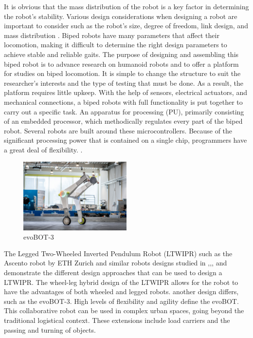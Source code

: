 It is obvious that the mass distribution of the robot is a key factor in determining the robot's stability.
Various design considerations when designing a robot are important to consider such as the robot's size, degree of freedom, link design, and mass distribution \cite{nath2017design}.
Biped robots have many parameters that affect their locomotion, making it difficult to determine the right design parameters to achieve stable and reliable gaits.
The purpose of designing and assembling this biped robot is to advance research on humanoid robots and to offer a platform for studies on biped locomotion.
It is simple to change the structure to suit the researcher's interests and the type of testing that must be done.
As a result, the platform requires little upkeep.
With the help of sensors, electrical actuators, and mechanical connections, a biped robots with full functionality is put together to carry out a specific task.
An apparatus for processing (PU), primarily consisting of an embedded processor, which methodically regulates every part of the biped robot.
Several robots are built around these microcontrollers.
Because of the significant processing power that is contained on a single chip, programmers have a great deal of flexibility.
 \cite{madadi2007design}.
\begin {figure}[h]
\centering
\includegraphics[width=0.5\textwidth]{evoBOT-3}
\caption{evoBOT-3\cite{klokowski2023evobot}}
\label{fig:evoBOT-3}
\end {figure}

The Legged Two-Wheeled Inverted Pendulum Robot (LTWIPR) such as the Ascento robot by ETH Zurich \cite{klemm2019ascento} and similar robots designs studied in \cite{guo2022design},\cite{zhang2022dynamic},\cite{cui2022modeling},\cite{hsu2022implementation} and \cite{xin2020online} demonstrate the different design approaches that can be used to design a LTWIPR. The wheel-leg hybrid design of the LTWIPR allows for the robot to have the advantages of both wheeled and legged robots.
another design differs, such as the evoBOT-3.
High levels of flexibility and agility define the evoBOT. This collaborative robot can be used in complex urban spaces, going beyond the traditional logistical context.
These extensions include load carriers and the passing and turning of objects.\cite{klokowski2023evobot}

